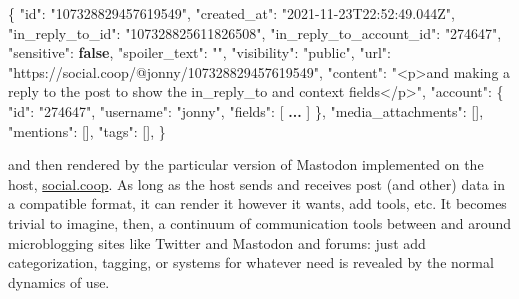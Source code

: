 \documentclass[notoc]{tufte-book}
\newenvironment{Shaded}{}{}
\newcommand{\DataTypeTok}[1]{\textcolor[rgb]{0.56,0.13,0.00}{#1}}
\newcommand{\ErrorTok}[1]{\textcolor[rgb]{1.00,0.00,0.00}{\textbf{#1}}}
\newcommand{\FunctionTok}[1]{\textcolor[rgb]{0.02,0.16,0.49}{#1}}
\newcommand{\KeywordTok}[1]{\textcolor[rgb]{0.00,0.44,0.13}{\textbf{#1}}}
\newcommand{\OtherTok}[1]{\textcolor[rgb]{0.00,0.44,0.13}{#1}}
\newcommand{\StringTok}[1]{\textcolor[rgb]{0.25,0.44,0.63}{#1}}
\begin{document}
\begin{Shaded}
\begin{Highlighting}[]
\FunctionTok{\{}
    \DataTypeTok{"id"}\FunctionTok{:} \StringTok{"107328829457619549"}\FunctionTok{,}
    \DataTypeTok{"created\_at"}\FunctionTok{:} \StringTok{"2021{-}11{-}23T22:52:49.044Z"}\FunctionTok{,}
    \DataTypeTok{"in\_reply\_to\_id"}\FunctionTok{:} \StringTok{"107328825611826508"}\FunctionTok{,}
    \DataTypeTok{"in\_reply\_to\_account\_id"}\FunctionTok{:} \StringTok{"274647"}\FunctionTok{,}
    \DataTypeTok{"sensitive"}\FunctionTok{:} \KeywordTok{false}\FunctionTok{,}
    \DataTypeTok{"spoiler\_text"}\FunctionTok{:} \StringTok{""}\FunctionTok{,}
    \DataTypeTok{"visibility"}\FunctionTok{:} \StringTok{"public"}\FunctionTok{,}
    \DataTypeTok{"url"}\FunctionTok{:} \StringTok{"https://social.coop/@jonny/107328829457619549"}\FunctionTok{,}
    \DataTypeTok{"content"}\FunctionTok{:} \StringTok{"\textless{}p\textgreater{}and making a reply to the post to show the in\_reply\_to and context fields\textless{}/p\textgreater{}"}\FunctionTok{,}
    \DataTypeTok{"account"}\FunctionTok{:}
    \FunctionTok{\{}
        \DataTypeTok{"id"}\FunctionTok{:} \StringTok{"274647"}\FunctionTok{,}
        \DataTypeTok{"username"}\FunctionTok{:} \StringTok{"jonny"}\FunctionTok{,}
        \DataTypeTok{"fields"}\FunctionTok{:}
        \OtherTok{[} \ErrorTok{...} \OtherTok{]}
    \FunctionTok{\},}
    \DataTypeTok{"media\_attachments"}\FunctionTok{:} \OtherTok{[]}\FunctionTok{,}
    \DataTypeTok{"mentions"}\FunctionTok{:} \OtherTok{[]}\FunctionTok{,}
    \DataTypeTok{"tags"}\FunctionTok{:} \OtherTok{[]}\FunctionTok{,}
\FunctionTok{\}}
\end{Highlighting}
\end{Shaded}

and then rendered by the particular version of Mastodon implemented on
the host, \href{https://social.coop}{social.coop}. As long as the host
sends and receives post (and other) data in a compatible format, it can
render it however it wants, add tools, etc. It becomes trivial to
imagine, then, a continuum of communication tools between and around
microblogging sites like Twitter and Mastodon and forums: just add
categorization, tagging, or systems for whatever need is revealed by the
normal dynamics of use.
\end{document}
